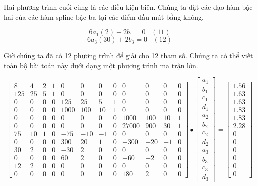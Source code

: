 Hai phương trình cuối cùng là các điều kiện biên. Chúng ta đặt các đạo hàm bậc hai của các hàm spline bậc ba tại các điểm đầu mút bằng không.

$$6a_{1}(2)+2b_{1}=0\;\;\;(11)$$
$$6a_{3}(30)+2b_{3}=0\;\;\;(12)$$

Giờ chúng ta đã có 12 phương trình để giải cho 12 tham số. Chúng ta có thể viết toàn bộ bài toán này dưới dạng một phương trình ma trận lớn.

$$
\begin{bmatrix} 
8 & 4 & 2 & 1 & 0 & 0 & 0 & 0 & 0 & 0 & 0 & 0 \\ 
125 & 25 & 5 & 1 & 0 & 0 & 0 & 0 & 0 & 0 & 0 & 0 \\ 
0 & 0 & 0 & 0 & 125 & 25 & 5 & 1 & 0 & 0 & 0 & 0 \\ 
0 & 0 & 0 & 0 & 1000 & 100 & 10 & 1 & 0 & 0 & 0 & 0 \\ 
0 & 0 & 0 & 0 & 0 & 0 & 0 & 0 & 1000 & 100 & 10 & 1 \\ 
0 & 0 & 0 & 0 & 0 & 0 & 0 & 0 & 27000 & 900 & 30 & 1 \\ 
75 & 10 & 1 & 0 & -75 & -10 & -1 & 0 & 0 & 0 & 0 & 0 \\ 
0 & 0 & 0 & 0 & 300 & 20 & 1 & 0 & -300 & -20 & -1 & 0 \\ 
30 & 2 & 0 & 0 & -30 & 2 & 0 & 0 & 0 & 0 & 0 & 0 \\ 
0 & 0 & 0 & 0 & 60 & 2 & 0 & 0 & -60 & -2 & 0 & 0 \\ 
12 & 2 & 0 & 0 & 0 & 0 & 0 & 0 & 0 & 0 & 0 & 0 \\ 
0 & 0 & 0 & 0 & 0 & 0 & 0 & 0 & 180 & 2 & 0 & 0 
\end{bmatrix}
\bullet
\begin{bmatrix} 
a_{1} \\ b_{1} \\ c_{1} \\ d_{1} \\ a_{2} \\ b_{2} \\ c_{2} \\ d_{2} \\ a_{3} \\ b_{3} \\ c_{3} \\ d_{3}
\end{bmatrix}
=
\begin{bmatrix} 
1.56 \\ 1.63 \\ 1.63 \\ 1.83 \\ 1.83 \\ 2.28 \\ 0 \\ 0 \\ 0 \\ 0 \\ 0 \\ 0 
\end{bmatrix}
$$

